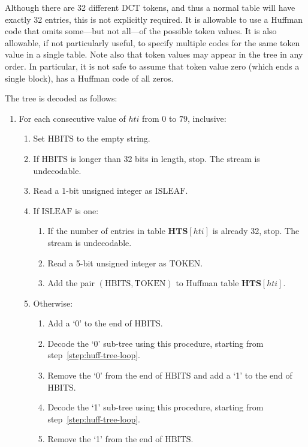 \documentclass[9pt,letterpaper]{book}
\newcommand{\idx}[1]{{\ensuremath{\mathit{#1}}}}
\newcommand{\hti}{\idx{hti}}
\newcommand{\bitvar}[1]{\ensuremath{\mathbf{\bm{#1}}}}
\newcommand{\locvar}[1]{\ensuremath{\mathrm{#1}}}
\numberwithin{equation}{chapter}
\numberwithin{figure}{chapter}
\numberwithin{table}{chapter}
\begin{document}
Although there are 32 different DCT tokens, and thus a normal table will have
 exactly 32 entries, this is not explicitly required.
It is allowable to use a Huffman code that omits some---but not all---of the
 possible token values.
It is also allowable, if not particularly useful, to specify multiple codes for
 the same token value in a single table.
Note also that token values may appear in the tree in any order.
In particular, it is not safe to assume that token value zero (which ends a
 single block), has a Huffman code of all zeros.

The tree is decoded as follows:

\begin{enumerate}
\item
For each consecutive value of \locvar{\hti} from $0$ to $79$, inclusive:
\begin{enumerate}
\item
Set \locvar{HBITS} to the empty string.
\item
\label{step:huff-tree-loop}
If \locvar{HBITS} is longer than 32 bits in length, stop.
The stream is undecodable.
\item
Read a 1-bit unsigned integer as \locvar{ISLEAF}.
\item
If \locvar{ISLEAF} is one:
\begin{enumerate}
\item
If the number of entries in table $\bitvar{HTS}[\locvar{\hti}]$ is already 32,
 stop.
The stream is undecodable.
\item
Read a 5-bit unsigned integer as \locvar{TOKEN}.
\item
Add the pair $(\locvar{HBITS},\locvar{TOKEN})$ to Huffman table
 $\bitvar{HTS}[\locvar{\hti}]$.
\end{enumerate}
\item
Otherwise:
\begin{enumerate}
\item
Add a `0' to the end of \locvar{HBITS}.
\item
Decode the `0' sub-tree using this procedure, starting from
 step~\ref{step:huff-tree-loop}.
\item
Remove the `0' from the end of \locvar{HBITS} and add a `1' to the end of
 \locvar{HBITS}.
\item
Decode the `1' sub-tree using this procedure, starting from
 step~\ref{step:huff-tree-loop}.
\item
Remove the `1' from the end of \locvar{HBITS}.
\end{enumerate}
\end{enumerate}
\end{enumerate}
\end{document}
